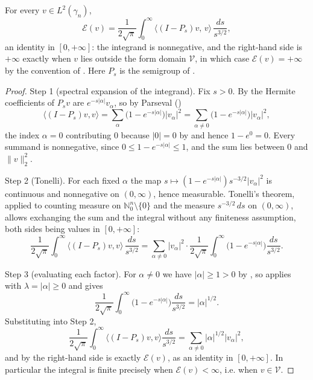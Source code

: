 \begin{lemma}
For every $v \in L^2(\gamma_n)$,
\[
  \mathcal{E}(v)
    = \frac{1}{2\sqrt\pi}\int_0^\infty
        \bigl\langle (I - P_s)v,\, v\bigr\rangle\, \frac{ds}{s^{3/2}},
\]
an identity in $[0,+\infty]$: the integrand is nonnegative, and the right-hand
side is $+\infty$ exactly when $v$ lies outside the form domain $\mathcal{V}$,
in which case $\mathcal{E}(v) = +\infty$ by the convention of .
Here $P_s$ is the semigroup of .
\end{lemma}
\begin{proof}
Step 1 (spectral expansion of the integrand).  Fix $s > 0$.  By
 the Hermite coefficients of $P_s v$ are
$e^{-s|\alpha|}v_\alpha$, so by Parseval ()
\[
  \bigl\langle (I-P_s)v, v\bigr\rangle
    = \sum_{\alpha} \bigl(1 - e^{-s|\alpha|}\bigr)|v_\alpha|^2
    = \sum_{\alpha \neq 0} \bigl(1 - e^{-s|\alpha|}\bigr)|v_\alpha|^2 ,
\]
the index $\alpha = 0$ contributing $0$ because $|0| = 0$ by
 and hence $1 - e^{0} = 0$.  Every summand is nonnegative,
since $0 \leq 1 - e^{-s|\alpha|}\leq 1$, and the sum lies between $0$ and
$\|v\|_2^2$.

Step 2 (Tonelli).  For each fixed $\alpha$ the map
$s \mapsto (1-e^{-s|\alpha|})s^{-3/2}|v_\alpha|^2$ is continuous and nonnegative
on $(0,\infty)$, hence measurable.  Tonelli's theorem, applied to counting
measure on $\mathbb{N}_0^n \setminus \{0\}$ and the measure
$s^{-3/2}\,ds$ on $(0,\infty)$, allows exchanging the sum and the integral
without any finiteness assumption, both sides being values in $[0,+\infty]$:
\[
  \frac{1}{2\sqrt\pi}\int_0^\infty
      \langle(I-P_s)v,v\rangle\,\frac{ds}{s^{3/2}}
    = \sum_{\alpha \neq 0}|v_\alpha|^2 \cdot
      \frac{1}{2\sqrt\pi}\int_0^\infty\bigl(1-e^{-s|\alpha|}\bigr)\frac{ds}{s^{3/2}} .
\]

Step 3 (evaluating each factor).  For $\alpha \neq 0$ we have
$|\alpha| \geq 1 > 0$ by , so
 applies with $\lambda = |\alpha| \geq 0$ and gives
\[
  \frac{1}{2\sqrt\pi}\int_0^\infty\bigl(1-e^{-s|\alpha|}\bigr)\frac{ds}{s^{3/2}}
    = |\alpha|^{1/2}.
\]
Substituting into Step 2,
\[
  \frac{1}{2\sqrt\pi}\int_0^\infty\langle(I-P_s)v,v\rangle\frac{ds}{s^{3/2}}
    = \sum_{\alpha\neq0}|\alpha|^{1/2}|v_\alpha|^2 ,
\]
and by  the right-hand side is exactly $\mathcal{E}(v)$, as an
identity in $[0,+\infty]$.  In particular the integral is finite precisely when
$\mathcal{E}(v) < \infty$, i.e. when $v \in \mathcal{V}$.
\end{proof}
